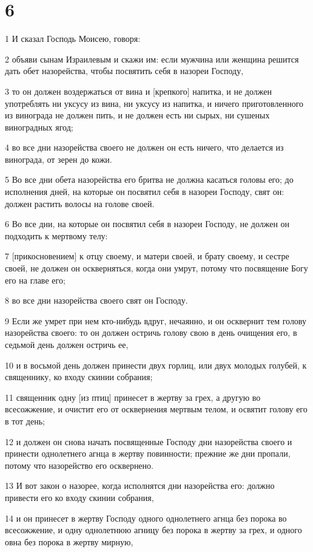\chapter{6}

\par 1 И сказал Господь Моисею, говоря:
\par 2 объяви сынам Израилевым и скажи им: если мужчина или женщина решится дать обет назорейства, чтобы посвятить себя в назореи Господу,
\par 3 то он должен воздержаться от вина и [крепкого] напитка, и не должен употреблять ни уксусу из вина, ни уксусу из напитка, и ничего приготовленного из винограда не должен пить, и не должен есть ни сырых, ни сушеных виноградных ягод;
\par 4 во все дни назорейства своего не должен он есть ничего, что делается из винограда, от зерен до кожи.
\par 5 Во все дни обета назорейства его бритва не должна касаться головы его; до исполнения дней, на которые он посвятил себя в назореи Господу, свят он: должен растить волосы на голове своей.
\par 6 Во все дни, на которые он посвятил себя в назореи Господу, не должен он подходить к мертвому телу:
\par 7 [прикосновением] к отцу своему, и матери своей, и брату своему, и сестре своей, не должен он оскверняться, когда они умрут, потому что посвящение Богу его на главе его;
\par 8 во все дни назорейства своего свят он Господу.
\par 9 Если же умрет при нем кто-нибудь вдруг, нечаянно, и он осквернит тем голову назорейства своего: то он должен остричь голову свою в день очищения его, в седьмой день должен остричь ее,
\par 10 и в восьмой день должен принести двух горлиц, или двух молодых голубей, к священнику, ко входу скинии собрания;
\par 11 священник одну [из птиц] принесет в жертву за грех, а другую во всесожжение, и очистит его от осквернения мертвым телом, и освятит голову его в тот день;
\par 12 и должен он снова начать посвященные Господу дни назорейства своего и принести однолетнего агнца в жертву повинности; прежние же дни пропали, потому что назорейство его осквернено.
\par 13 И вот закон о назорее, когда исполнятся дни назорейства его: должно привести его ко входу скинии собрания,
\par 14 и он принесет в жертву Господу одного однолетнего агнца без порока во всесожжение, и одну однолетнюю агницу без порока в жертву за грех, и одного овна без порока в жертву мирную,
